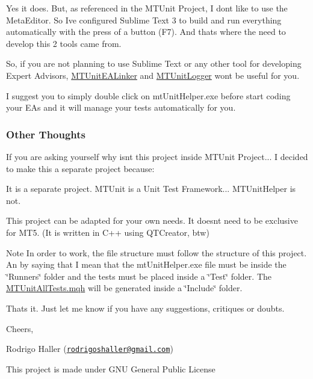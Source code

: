Yes it does. But, as referenced in the M\+T\+Unit Project, I don\textquotesingle{}t like to use the Meta\+Editor. So I\textquotesingle{}ve configured Sublime Text 3 to build and run everything automatically with the press of a button (F7). And that\textquotesingle{}s where the need to develop this 2 tools came from.

So, if you are not planning to use Sublime Text or any other tool for developing Expert Advisors, \mbox{\hyperlink{class_m_t_unit_e_a_linker}{M\+T\+Unit\+E\+A\+Linker}} and \mbox{\hyperlink{class_m_t_unit_logger}{M\+T\+Unit\+Logger}} won\textquotesingle{}t be useful for you.

I suggest you to simply double click on mt\+Unit\+Helper.\+exe before start coding your E\+As and it will manage your tests automatically for you.

\subsubsection*{Other Thoughts}

If you are asking yourself why isn\textquotesingle{}t this project inside M\+T\+Unit Project... I decided to make this a separate project because\+:
\begin{DoxyItemize}
\item It is a separate project. M\+T\+Unit is a Unit Test Framework... M\+T\+Unit\+Helper is not.
\item This project can be adapted for your own needs. It doesn\textquotesingle{}t need to be exclusive for M\+T5. (It is written in C++ using Q\+T\+Creator, btw)
\end{DoxyItemize}

\begin{DoxyNote}{Note}
In order to work, the file structure must follow the structure of this project. An by saying that I mean that the mt\+Unit\+Helper.\+exe file must be inside the \char`\"{}\+Runners\char`\"{} folder and the tests must be placed inside a \char`\"{}\+Test\char`\"{} folder. The \mbox{\hyperlink{_m_t_unit_all_tests_8mqh}{M\+T\+Unit\+All\+Tests.\+mqh}} will be generated inside a \char`\"{}\+Include\char`\"{} folder.
\end{DoxyNote}
That\textquotesingle{}s it. Just let me know if you have any suggestions, critiques or doubts.

Cheers,

Rodrigo Haller (\href{mailto:rodrigoshaller@gmail.com}{\tt rodrigoshaller@gmail.\+com})

This project is made under G\+NU General Public License 